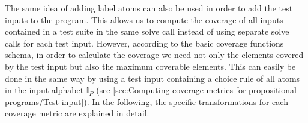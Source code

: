 The same idea of adding label atoms can also be used in order to add the test inputs to the program. This allows us to compute the coverage of all inputs contained in a test suite in the same solve call instead of using separate solve calls for each test input. However, according to the basic coverage functions schema, in order to calculate the coverage we need not only the elements covered by the test input but also the maximum coverable elements. This can easily be done in the same way by using a test input containing a choice rule of all atoms in the input alphabet $\mathbb{I}_P$ (see \cref{sec:Computing coverage metrics for propositional programs/Test input}). In the following, the specific transformations for each coverage metric are explained in detail.

\begin{comment}
    - the goal is to compute the coverage using ASP     \/
    
    -> introduce labels for each coverage metric -> add them to the program in a specific way (based on the coverage metric)  -> solve normally using clingo -> if the label is in the answer set, the corresponding object is covered      \/
    
    - I only add new rules, dont change or take away existing ones (except constraints -> see above) and these new rules only produce labels not predicates that are part of the original program -> the resulting program is still equivalent! (maybe proof?)      \/
    
    - with this method, to find total positive and negative coverage it is not necessary to look at every model in the solve call. Instead use one solve call with brave consequences and one with cautious consequences! -> more efficient than looking at every model!        \/
    
    - labels can also be used to add the testcases to the program -> this way coverage for all testcases can be computed in the same solve call instead of needing one call per testcase        \/
    
    -> this is done by: adding a choice rule $\{\_i0;...;\_in\}$. for n testcases in the testsuite, adding rules $a_i :- i_j$. for every atom i in the testcase j.
    (- why does this work?
    - why does this not change the program?)
    
    - maximum coverage needs to be computed to get accurate coverage numbers!       \/
    
    -> done by calculating the coverage normally but instead of testcases adding a rule $\{a_0;...;a_n\}$. where $a_0...a_n$ are all possible inputatoms (see definition input/output) -> these have to be specified in advance by the user!
\end{comment}

